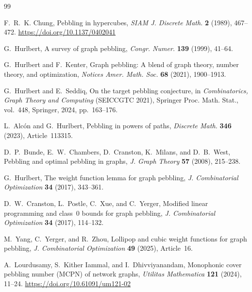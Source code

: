 \documentclass[11pt]{article}
\begin{document}
\begin{thebibliography}{99}



F.~R.~K. Chung,
Pebbling in hypercubes,
\emph{SIAM J. Discrete Math.}
\textbf{2} (1989), 467--472.
\url{https://doi.org/10.1137/0402041}



G.~Hurlbert,
A survey of graph pebbling,
\emph{Congr. Numer.}
\textbf{139} (1999), 41--64.



G.~Hurlbert and F.~Kenter,
Graph pebbling: A blend of graph theory, number theory, and optimization,
\emph{Notices Amer. Math. Soc.}
\textbf{68} (2021), 1900--1913.



G.~Hurlbert and E.~Seddiq,
On the target pebbling conjecture,
in \emph{Combinatorics, Graph Theory and Computing} (SEICCGTC 2021),
Springer Proc. Math. Stat.,
vol.~448,
Springer,
2024,
pp.~163--176.



L.~Alc\'on and G.~Hurlbert,
Pebbling in powers of paths,
\emph{Discrete Math.}
\textbf{346} (2023),
Article~113315.



D.~P.~Bunde,
E.~W.~Chambers,
D.~Cranston,
K.~Milans,
and D.~B.~West,
Pebbling and optimal pebbling in graphs,
\emph{J. Graph Theory}
\textbf{57} (2008),
215--238.



G.~Hurlbert,
The weight function lemma for graph pebbling,
\emph{J. Combinatorial Optimization}
\textbf{34} (2017),
343--361.



D.~W.~Cranston,
L.~Postle,
C.~Xue,
and C.~Yerger,
Modified linear programming and class~0 bounds for graph pebbling,
\emph{J. Combinatorial Optimization}
\textbf{34} (2017),
114--132.



M.~Yang,
C.~Yerger,
and R.~Zhou,
Lollipop and cubic weight functions for graph pebbling,
\emph{J. Combinatorial Optimization}
\textbf{49} (2025),
Article~16.



A.~Lourdusamy,
S.~Kither Iammal,
and I.~Dhivviyanandam,
Monophonic cover pebbling number (MCPN) of network graphs,
\emph{Utilitas Mathematica}
\textbf{121} (2024),
11--24.
\url{https://doi.org/10.61091/um121-02}



\end{thebibliography}
\end{document}
